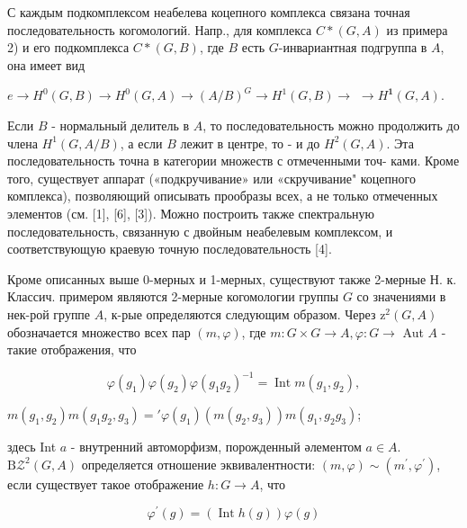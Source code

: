\documentclass[10pt]{article}
\begin{document}
С каждым подкомплексом неабелева коцепного комплекса связана точная последовательность когомологий. Напр., для комплекса $C *(G, A)$ из примера 2) и его подкомплекса $C *(G, B)$, где $B$ есть $G$-инвариантная подгруппа в $A$, она имеет вид



$e \longrightarrow H^{0}(G, B) \longrightarrow H^{0}(G, A) \longrightarrow(A / B)^{G} \longrightarrow H^{1}(G, B) \longrightarrow$ $\longrightarrow H^{\mathbf{1}}(G, A)$.



Если $B$ - нормальный делитель в $A$, то последовательность можно продолжить до члена $H^{1}(G, A / B)$, а если $B$ лежит в центре, то - и до $H^{2}(G, A)$. Эта последовательность точна в категории множеств с отмеченными точ- ками. Кроме того, существует аппарат («подкручивание» или «скручивание" коцепного комплекса), позволяющий описывать прообразы всех, а не только отмеченных элементов (см. [1], [6], [3]). Можно построить также спектральную последовательность, связанную с двойным неабелевым комплексом, и соответствующую краевую точную последовательность [4].



Кроме описанных выше 0-мерных и 1-мерных, существуют также 2-мерные Н. к. Классич. примером являются 2-мерные когомологии группы $G$ со значениями в нек-рой группе $A$, к-рые определяются следующим образом. Через $\mathrm{z}^{2}(G, A)$ обозначается множество всех пар $(m, \varphi)$, где $m: G \times G \longrightarrow A, \varphi: G \longrightarrow$ Aut $A$ - такие отображения, что



\[

\varphi\left(g_{1}\right) \varphi\left(g_{2}\right) \varphi\left(g_{1} g_{2}\right)^{-1}=\operatorname{Int} m\left(g_{1}, g_{2}\right),

\]



$m\left(g_{1}, g_{2}\right) m\left(g_{1} g_{2}, g_{3}\right)=' \varphi\left(g_{1}\right)\left(m\left(g_{2}, g_{3}\right)\right) m\left(g_{1}, g_{2} g_{3}\right)$;



здесь Int $a$ - внутренний автоморфизм, порожденный әлементом $a \in A$. $\mathrm{B} \mathcal{Z}^{2}(G, A)$ определяется отношение эквивалентности: $(m, \varphi) \sim\left(m^{\prime}, \varphi^{\prime}\right)$, если существует такое отображение $h: G \rightarrow A$, что



\[

\varphi^{\prime}(g)=(\operatorname{Int} h(g)) \varphi(g)

\]
\end{document}
